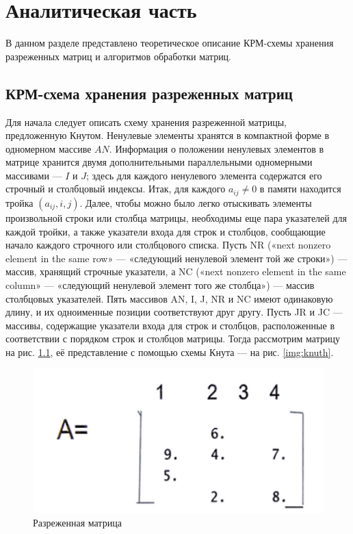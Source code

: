 \chapter{Аналитическая часть}

В данном разделе представлено теоретическое описание КРМ-схемы хранения разреженных матриц и алгоритмов обработки матриц.

\section{КРМ-схема хранения разреженных матриц}

Для начала следует описать схему хранения разреженной матрицы, предложенную Кнутом. Ненулевые элементы хранятся в компактной форме в одномерном массиве $AN$. Информация о положении ненулевых элементов в матрице хранится двумя дополнительными параллельными одномерными массивами --- $I$ и $J$; здесь для каждого ненулевого элемента содержатся его строчный и столбцовый индексы. Итак, для каждого $a_{ij} \neq 0$ в памяти находится тройка $(a_{ij}, i, j)$. Далее, чтобы можно было легко отыскивать элементы произвольной строки или столбца матрицы, необходимы еще пара указателей для каждой тройки, а также указатели входа для строк и столбцов, сообщающие начало каждого строчного или столбцового списка. Пусть NR («next nonzero element in the same row» --- «следующий ненулевой элемент той же строки») --- массив, хранящий строчные указатели, а NC («next nonzero element in the same column» --- «следующий ненулевой элемент того же столбца») --- массив столбцовых указателей.
Пять массивов AN, I, J, NR и NC имеют одинаковую длину, и их одноименные позиции соответствуют друг другу. Пусть JR и JC --- массивы, содержащие указатели входа для строк и столбцов, расположенные в соответствии с порядком строк и столбцов матрицы. Тогда рассмотрим матрицу на рис. \ref{img:matrix}, её представление с помощью схемы Кнута --- на рис. \ref{img:knuth}.

\begin{figure}[H]
	\begin{center}
		\includegraphics[scale=0.7]{img/matrix.png}
	\end{center}
	\captionsetup{justification=centering}
	\caption{Разреженная матрица}
	\label{img:matrix}
\end{figure}


